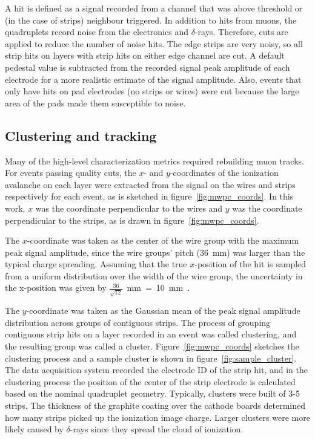 A hit is defined as a signal recorded from a channel that was above threshold or (in the case of strips) neighbour triggered. In addition to hits from muons, the quadruplets record noise from the electronics and $\delta$-rays. Therefore, cuts are applied to reduce the number of noise hits. The edge strips are very noisy, so all strip hits on layers with strip hits on either edge channel are cut. A default pedestal value is subtracted from the recorded signal peak amplitude of each electrode for a more realistic estimate of the signal amplitude. Also, events that only have hits on pad electrodes (no strips or wires) were cut because the large area of the pads made them susceptible to noise.

\subsection{Clustering and tracking}
Many of the high-level characterization metrics required rebuilding muon tracks. For events passing quality cuts, the $x$- and $y$-coordinates of the ionization avalanche on each layer were extracted from the signal on the wires and strips respectively for each event, as is sketched in figure~\ref{fig:mwpc_coords}. In this work, $x$ was the coordinate perpendicular to the wires and $y$ was the coordinate perpendicular to the strips, as is drawn in figure~\ref{fig:mwpc_coords}.

The $x$-coordinate was taken as the center of the wire group with the maximum peak signal amplitude, since the wire groups' pitch (\SI{36}{\milli\meter}) was larger than the typical charge spreading. Assuming that the true $x$-position of the hit is sampled from a uniform distribution over the width of the wire group, the uncertainty in the x-position was given by $\frac{36}{\sqrt{12}}$~mm~=~10~mm~\cite{Sauli:117989}.

The $y$-coordinate was taken as the Gaussian mean of the peak signal amplitude distribution across groups of contiguous strips. The process of grouping contiguous strip hits on a layer recorded in an event was called clustering, and the resulting group was called a cluster. Figure~\ref{fig:mwpc_coords} sketches the clustering process and a sample cluster is shown in figure~\ref{fig:sample_cluster}. The data acquisition system recorded the electrode ID of the strip hit, and in the clustering process the position of the center of the strip electrode is calculated based on the nominal quadruplet geometry. Typically, clusters were built of 3-5 strips. The thickness of the graphite coating over the cathode boards determined how many strips picked up the ionization image charge. Larger clusters were more likely caused by $\delta$-rays since they spread the cloud of ionization. 

